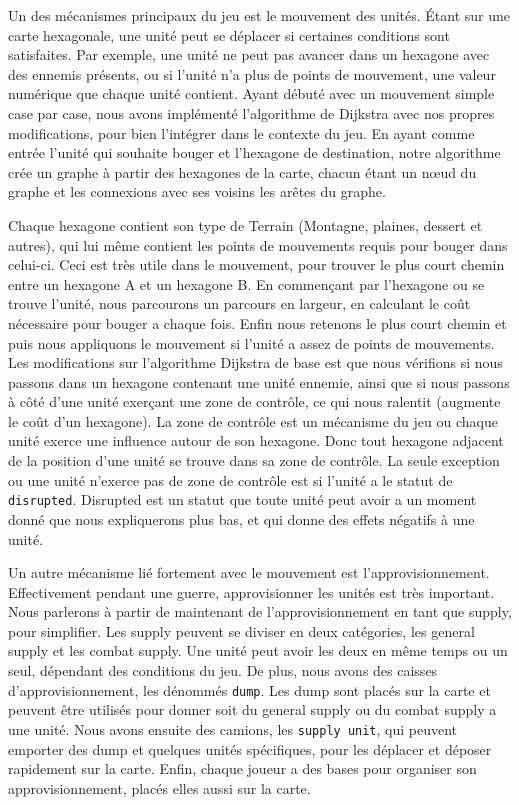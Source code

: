 Un des mécanismes principaux du jeu est le mouvement des unités.
Étant sur une carte hexagonale, une unité peut se déplacer si certaines conditions sont satisfaites.
Par exemple, une unité ne peut pas avancer dans un hexagone avec des ennemis présents, ou si l'unité n'a plus de
points de mouvement, une valeur numérique que chaque unité contient. Ayant débuté avec un mouvement simple case
par case, nous avons implémenté l'algorithme de Dijkstra avec nos propres modifications, pour bien l'intégrer dans
le contexte du jeu. En ayant comme entrée l'unité qui souhaite bouger et l'hexagone de destination, notre algorithme
crée un graphe à partir des hexagones de la carte, chacun étant un nœud du graphe et les connexions avec ses voisins
les arêtes du graphe.

Chaque hexagone contient son type de Terrain (Montagne, plaines, dessert et autres), qui lui même contient les points
de mouvements requis pour bouger dans celui-ci. Ceci est très utile dans le mouvement, pour trouver le plus court
chemin entre un hexagone A et un hexagone B. En commençant par l'hexagone ou se trouve l'unité, nous parcourons un
parcours en largeur, en calculant le coût nécessaire pour bouger a chaque fois. Enfin nous retenons le plus court
chemin et puis nous appliquons le mouvement si l'unité a assez de points de mouvements. Les modifications sur
l'algorithme Dijkstra de base est que nous vérifions si nous passons dans un hexagone contenant une unité ennemie,
ainsi que si nous passons à côté d'une unité exerçant une zone de contrôle, ce qui nous ralentit (augmente le coût
d'un hexagone). La zone de contrôle est un mécanisme du jeu ou chaque unité exerce une influence autour de son
hexagone. Donc tout hexagone adjacent de la position d'une unité se trouve dans sa zone de contrôle.
La seule exception ou une unité n'exerce pas de zone de contrôle est si l'unité a le statut de {\tt disrupted}.
Disrupted est un statut que toute unité peut avoir a un moment donné que nous expliquerons plus bas, et qui donne
des effets négatifs à une unité.

Un autre mécanisme lié fortement avec le mouvement est l'approvisionnement. Effectivement pendant une guerre,
approvisionner les unités est très important. Nous parlerons à partir de maintenant de l'approvisionnement en
tant que supply, pour simplifier. Les supply peuvent se diviser en deux catégories, les general supply et les
combat supply. Une unité peut avoir les deux en même temps ou un seul, dépendant des conditions du jeu. De plus,
nous avons des caisses d'approvisionnement, les dénommés {\tt dump}. Les dump sont placés sur la carte et peuvent
être utilisés pour donner soit du general supply ou du combat supply a une unité. Nous avons ensuite des camions,
les {\tt supply unit}, qui peuvent emporter des dump et quelques unités spécifiques, pour les déplacer et déposer
rapidement sur la carte. Enfin, chaque joueur a des bases pour organiser son approvisionnement, placés elles aussi
sur la carte.

